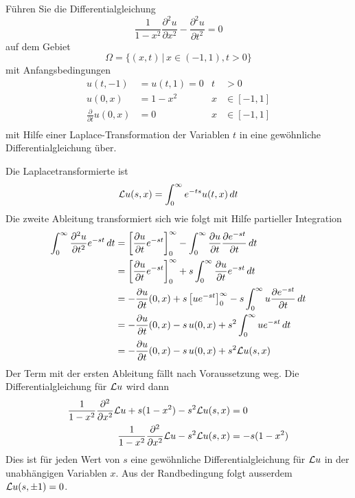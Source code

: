 Führen Sie die Differentialgleichung
\[
\frac1{1-x^2}\frac{\partial^2 u}{\partial x^2}
-
\frac{\partial^2 u}{\partial t^2}=0
\]
auf dem Gebiet
\[
\Omega=\{(x,t)\,|\, x\in (-1,1), t>0\}
\]
mit Anfangsbedingungen
\begin{align*}
u(t,-1)&=u(t,1)=0&t&>0\\
u(0,x)&=1-x^2&x&\in[-1,1]\\
\frac{\partial}{\partial t}u(0,x)&=0&x&\in[-1,1]\\
\end{align*}
mit Hilfe einer Laplace-Transformation der Variablen $t$ in eine
gewöhnliche Differentialgleichung über.

\begin{loesung}
Die Laplacetransformierte ist
\[
{\cal L}u(s,x)=\int_0^{\infty}e^{-ts}u(t,x)\,dt
\]
Die zweite Ableitung transformiert sich wie folgt mit Hilfe
partieller Integration
\begin{align*}
\int_0^\infty \frac{\partial^2u}{\partial t^2}e^{-st}\,dt
&=
\left[
\frac{\partial u}{\partial t}e^{-st}
\right]_0^\infty
-\int_0^\infty
\frac{\partial u}{\partial t}\frac{\partial e^{-st}}{\partial t}
\,dt
\\
&=
\left[
\frac{\partial u}{\partial t}e^{-st}
\right]_0^\infty
+s\int_0^\infty
\frac{\partial u}{\partial t}e^{-st}
\,dt
\\
&=
-\frac{\partial u}{\partial t}(0,x)
+s\left[
ue^{-st}
\right]_0^\infty
-s\int_0^\infty u\frac{\partial e^{-st}}{\partial t}\,dt
\\
&=
-\frac{\partial u}{\partial t}(0,x)
-s\,
u(0,x)
+s^2\int_0^\infty u e^{-st}\,dt
\\
&=
-\frac{\partial u}{\partial t}(0,x)
-s\,u(0,x)+s^2{\cal L}u(s,x)
\end{align*}
Der Term mit der ersten Ableitung fällt nach Voraussetzung weg.
Die Differentialgleichung für ${\cal L}u$ wird dann
\begin{align*}
\frac1{1-x^2}\frac{\partial^2}{\partial x^2}{\cal L}u
+s(1-x^2)-s^2{\cal L}u(s,x)
&=0
\\
\frac1{1-x^2}\frac{\partial^2}{\partial x^2}{\cal L}u
-s^2{\cal L}u(s,x)
&=-s(1-x^2)
\end{align*}
Dies ist für jeden Wert von $s$ eine gewöhnliche Differentialgleichung
für ${\cal L}u$ in der unabhängigen Variablen $x$.
Aus der Randbedingung folgt ausserdem ${\cal L}u(s,\pm 1)=0$.
\end{loesung}
